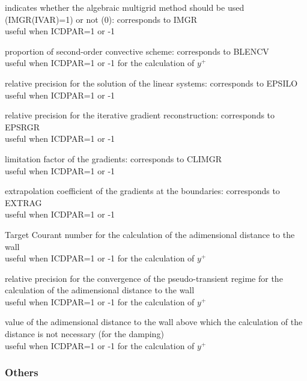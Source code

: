 {indicates whether the algebraic
multigrid method should be used (IMGR(IVAR)=1) or not (0): corresponds to IMGR\\
useful when ICDPAR=1 or -1}

{proportion of second-order convective scheme: corresponds to BLENCV\\
useful when ICDPAR=1 or -1 for the calculation of $y^+$}

{relative precision for the solution of the linear systems: corresponds to EPSILO\\
useful when ICDPAR=1 or -1}

{relative precision for the iterative gradient reconstruction: corresponds to EPSRGR\\
useful when ICDPAR=1 or -1}

{limitation factor of the gradients: corresponds to CLIMGR\\
useful when ICDPAR=1 or -1}

{extrapolation coefficient of the gradients at the boundaries: corresponds to EXTRAG\\
useful when ICDPAR=1 or -1}

{Target Courant number for the calculation of the adimensional distance
to the wall\\
useful when ICDPAR=1 or -1 for the calculation of $y^+$}

{relative precision for the convergence of the pseudo-transient regime
for the calculation of the adimensional distance to the wall\\
useful when ICDPAR=1 or -1  for the calculation of $y^+$}

{value of the adimensional distance to the wall above which the
calculation of the distance is not necessary (for the damping)\\
useful when ICDPAR=1 or -1 for the calculation of $y^+$}


\subsubsection{Others}

